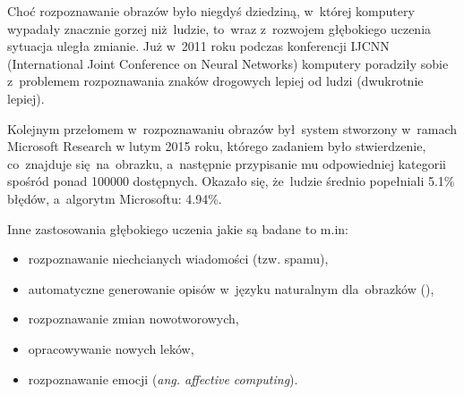 Choć rozpoznawanie obrazów było niegdyś dziedziną, w~której komputery wypadały
znacznie gorzej niż~ludzie, to~wraz z~rozwojem głębokiego uczenia sytuacja
uległa zmianie. Już w~2011 roku podczas konferencji IJCNN (International Joint
Conference on Neural Networks) komputery poradziły sobie z~problemem
rozpoznawania znaków drogowych lepiej od ludzi (dwukrotnie lepiej).

Kolejnym przełomem w~rozpoznawaniu obrazów był~system stworzony w~ramach
Microsoft Research w lutym 2015 roku, którego zadaniem było stwierdzenie,
co~znajduje się~na~obrazku, a~następnie przypisanie mu odpowiedniej kategorii spośród
ponad 100000 dostępnych. Okazało się, że~ludzie średnio popełniali 5.1\% błędów,
a~algorytm Microsoftu: 4.94\%.

Inne zastosowania głębokiego uczenia jakie są badane to m.in:
\begin{itemize}
  \item rozpoznawanie niechcianych wiadomości (tzw. spamu),
  \item automatyczne generowanie opisów w~języku naturalnym dla~obrazków (\cite{img-desc-generator}),
  \item rozpoznawanie zmian nowotworowych,
  \item opracowywanie nowych leków,
  \item rozpoznawanie emocji (\textit{ang. affective computing}).
\end{itemize}
